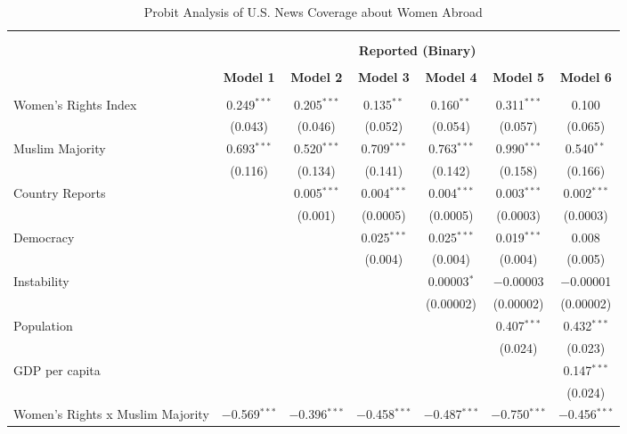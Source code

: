 
\begin{table}[!htbp] \centering 
  \caption{Probit Analysis of U.S. News Coverage about Women Abroad} 
  \label{table:probit-part} 
\begin{tabular}{@{\extracolsep{5pt}}lcccccc} 
\\[-1.8ex]\hline \\[-1.8ex] 
\\[-1.8ex] & \multicolumn{6}{c}{\textbf{Reported (Binary)}} \\ 
\\[-1.8ex] & \textbf{Model 1} & \textbf{Model 2} & \textbf{Model 3} & \textbf{Model 4} & \textbf{Model 5} & \textbf{Model 6}\\ 
\hline \\[-1.8ex] 
 Women's Rights Index & 0.249$^{***}$ & 0.205$^{***}$ & 0.135$^{**}$ & 0.160$^{**}$ & 0.311$^{***}$ & 0.100 \\ 
  & (0.043) & (0.046) & (0.052) & (0.054) & (0.057) & (0.065) \\ 
  Muslim Majority & 0.693$^{***}$ & 0.520$^{***}$ & 0.709$^{***}$ & 0.763$^{***}$ & 0.990$^{***}$ & 0.540$^{**}$ \\ 
  & (0.116) & (0.134) & (0.141) & (0.142) & (0.158) & (0.166) \\ 
  Country Reports &  & 0.005$^{***}$ & 0.004$^{***}$ & 0.004$^{***}$ & 0.003$^{***}$ & 0.002$^{***}$ \\ 
  &  & (0.001) & (0.0005) & (0.0005) & (0.0003) & (0.0003) \\ 
  Democracy &  &  & 0.025$^{***}$ & 0.025$^{***}$ & 0.019$^{***}$ & 0.008 \\ 
  &  &  & (0.004) & (0.004) & (0.004) & (0.005) \\ 
  Instability &  &  &  & 0.00003$^{*}$ & $-$0.00003 & $-$0.00001 \\ 
  &  &  &  & (0.00002) & (0.00002) & (0.00002) \\ 
  Population &  &  &  &  & 0.407$^{***}$ & 0.432$^{***}$ \\ 
  &  &  &  &  & (0.024) & (0.023) \\ 
  GDP per capita &  &  &  &  &  & 0.147$^{***}$ \\ 
  &  &  &  &  &  & (0.024) \\ 
  Women's Rights x Muslim Majority & $-$0.569$^{***}$ & $-$0.396$^{***}$ & $-$0.458$^{***}$ & $-$0.487$^{***}$ & $-$0.750$^{***}$ & $-$0.456$^{***}$ \\ 

\end{tabular}
\end{table}
